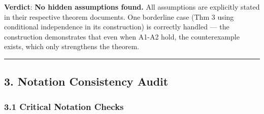 \documentclass[
  12pt,
]{ctexart}
\begin{document}
\textbf{Verdict}: \textbf{No hidden assumptions found.} All assumptions
are explicitly stated in their respective theorem documents. One
borderline case (Thm 3 using conditional independence in its
construction) is correctly handled --- the construction demonstrates
that even when A1-A2 hold, the counterexample exists, which only
strengthens the theorem.

\begin{center}\rule{0.5\linewidth}{0.5pt}\end{center}

\subsection{3. Notation Consistency
Audit}\label{notation-consistency-audit}

\subsubsection{3.1 Critical Notation
Checks}\label{critical-notation-checks}
\end{document}
